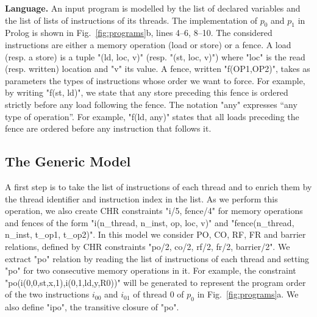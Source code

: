 \medskip\noindent
\textbf{Language.}
An input program is modelled by the list of declared variables and the list
of lists of instructions of its threads. The implementation of $p_0$ and $p_1$
in Prolog is shown in Fig.~\ref{fig:programs}b, lines 4--6, 8--10.
The considered instructions are either a memory operation (load or store) or a fence.
A load (resp. a store) is a tuple "(ld, loc, v)" 
(resp. "(st, loc, v)") where "loc" is the read
(resp. written) location and "v" its value. 
A fence, written "f(OP1,OP2)", takes as parameters the types
of instructions whose order we want to force. For example, by writing
"f(st, ld)", we state that any store preceding this fence
is ordered strictly before any load following the fence.
The notation "any" expresses ``any type of operation''. For
example, "f(ld, any)" states that all loads preceding the
fence are ordered before any instruction that follows it. 


\subsection{The Generic Model}
\label{subsec:generic-model}
A first step is to take the list of instructions of each thread and to enrich them 
by the thread identifier and instruction index in the list. 
As we perform this operation, we also create 
CHR constraints "i/5, fence/4" for memory operations and fences of the form 
"i(n_thread, n_inst,  op, loc, v)" and "fence(n_thread, n_inst, t_op1, t_op2)".
In this model we consider PO, CO, RF, FR and barrier relations, defined by 
CHR constraints "po/2, co/2, rf/2, fr/2, barrier/2".  
We extract "po" relation by reading the list of instructions of each thread and setting 
"po" for two consecutive memory operations in it.
For example, the constraint "po(i(0,0,st,x,1),i(0,1,ld,y,R0))" will be generated to
represent the program order of the two instructions  $i_{00}$ and $i_{01}$ of thread 0 of $p_0$ 
in Fig.~\ref{fig:programs}a. We also define "ipo", the transitive closure of "po".

